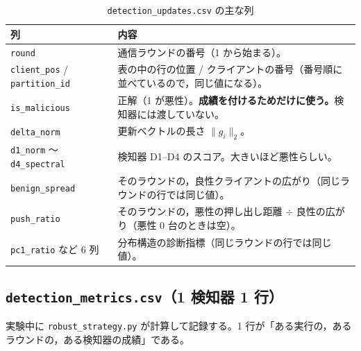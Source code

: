 \documentclass[a4j, dvipdfmx]{jsarticle}  %
\begin{document}
\begin{table}[H]
\centering
\caption{\texttt{detection\_updates.csv} の主な列}
\begin{tabular}{@{}P{4.4cm} P{10.9cm}@{}}
\toprule
列 & 内容 \\
\midrule
\texttt{round} & 通信ラウンドの番号（1 から始まる）。 \\
\texttt{client\_pos} / \texttt{partition\_id} & 表の中の行の位置 / クライアントの番号（番号順に並べているので，同じ値になる）。 \\
\texttt{is\_malicious} & 正解（1 が悪性）。\textbf{成績を付けるためだけに使う。}検知器には渡していない。 \\
\texttt{delta\_norm} & 更新ベクトルの長さ $\|g_i\|_2$。 \\
\texttt{d1\_norm} 〜 \texttt{d4\_spectral} & 検知器 D1--D4 のスコア。大きいほど悪性らしい。 \\
\texttt{benign\_spread} & そのラウンドの，良性クライアントの広がり（同じラウンドの行では同じ値）。 \\
\texttt{push\_ratio} & そのラウンドの，悪性の押し出し距離 $\div$ 良性の広がり（悪性 0 台のときは空）。 \\
\texttt{pc1\_ratio} など 6 列 & 分布構造の診断指標（同じラウンドの行では同じ値）。 \\
\bottomrule
\end{tabular}
\end{table}

\subsection{\texttt{detection\_metrics.csv}（1 検知器 1 行）}

実験中に \texttt{robust\_strategy.py} が計算して記録する。1 行が「ある実行の，あるラウンドの，ある検知器の成績」である。
\end{document}
